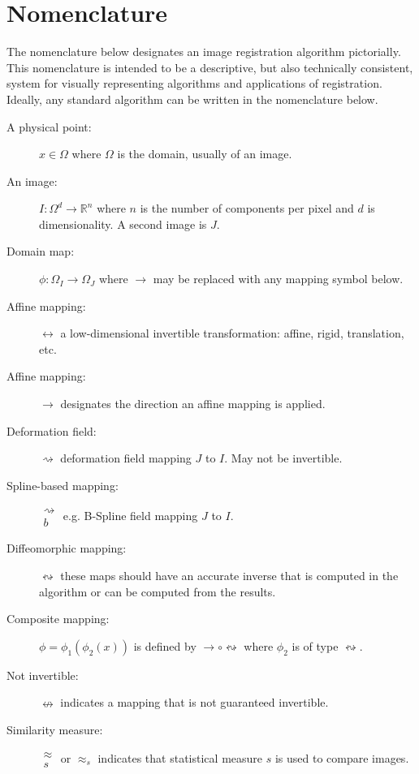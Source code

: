 \documentclass{llncs}
\begin{document}
\section{Nomenclature}
The nomenclature below designates an image registration
algorithm pictorially.  This nomenclature is intended to be a
descriptive, but also technically consistent, system for visually
representing algorithms and applications of registration.  Ideally,
any standard algorithm can be written in the nomenclature below.
\begin{description}
\item [A physical point:] $x \in \Omega$ where $\Omega$ is the domain,
  usually of an image.
\item [An image:]  $ I \colon \Omega^d \to \mathbb{R}^n$ where $n$ is the
  number of components per pixel and $d$ is dimensionality.  A second
  image is $J$. 
\item [Domain map:] $ \phi \colon \Omega_I \to \Omega_J $ where $\to$ may be
  replaced with any mapping symbol below. 
\item [Affine mapping:] $\leftrightarrow$ a low-dimensional invertible 
  transformation: affine, rigid, translation, etc. 
\item [Affine mapping:] $\rightarrow$ designates the direction an
  affine mapping is applied.  
\item [Deformation field:] $ \rightsquigarrow$ deformation field mapping $J$
  to $I$.  May not be invertible.
\item [Spline-based mapping:] $\substack{
   \rightsquigarrow \\
   b
  }$ e.g. B-Spline field mapping $J$
  to $I$.
\item [Diffeomorphic mapping:] $ \leftrightsquigarrow$ these maps
  should have an accurate inverse that is computed in the algorithm or can be computed from the results.
\item [Composite mapping:] $\phi=\phi_1(\phi_2(x))$ is defined by
  $\rightarrow \circ \leftrightsquigarrow$ where $\phi_2$ is of type
  $\leftrightsquigarrow$. 
\item[Not invertible:]  $\nleftrightarrow$ indicates a mapping that is
  not guaranteed invertible.
\item [Similarity measure:] $\substack{
   \approx \\
   s
  }$ or $\approx_s$ indicates that statistical measure $s$ is used to compare images.
\end{description}
\end{document}
